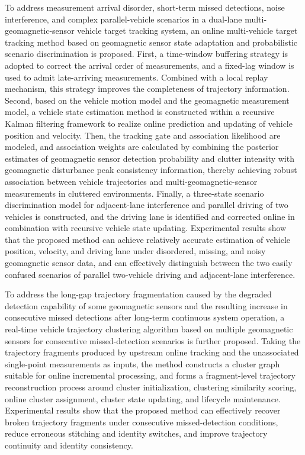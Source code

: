 To address measurement arrival disorder, short-term missed detections, noise interference, and complex parallel-vehicle scenarios in a dual-lane multi-geomagnetic-sensor vehicle target tracking system, an online multi-vehicle target tracking method based on geomagnetic sensor state adaptation and probabilistic scenario discrimination is proposed. First, a time-window buffering strategy is adopted to correct the arrival order of measurements, and a fixed-lag window is used to admit late-arriving measurements. Combined with a local replay mechanism, this strategy improves the completeness of trajectory information. Second, based on the vehicle motion model and the geomagnetic measurement model, a vehicle state estimation method is constructed within a recursive Kalman filtering framework to realize online prediction and updating of vehicle position and velocity. Then, the tracking gate and association likelihood are modeled, and association weights are calculated by combining the posterior estimates of geomagnetic sensor detection probability and clutter intensity with geomagnetic disturbance peak consistency information, thereby achieving robust association between vehicle trajectories and multi-geomagnetic-sensor measurements in cluttered environments. Finally, a three-state scenario discrimination model for adjacent-lane interference and parallel driving of two vehicles is constructed, and the driving lane is identified and corrected online in combination with recursive vehicle state updating. Experimental results show that the proposed method can achieve relatively accurate estimation of vehicle position, velocity, and driving lane under disordered, missing, and noisy geomagnetic sensor data, and can effectively distinguish between the two easily confused scenarios of parallel two-vehicle driving and adjacent-lane interference.

To address the long-gap trajectory fragmentation caused by the degraded detection capability of some geomagnetic sensors and the resulting increase in consecutive missed detections after long-term continuous system operation, a real-time vehicle trajectory clustering algorithm based on multiple geomagnetic sensors for consecutive missed-detection scenarios is further proposed. Taking the trajectory fragments produced by upstream online tracking and the unassociated single-point measurements as inputs, the method constructs a cluster graph suitable for online incremental processing, and forms a fragment-level trajectory reconstruction process around cluster initialization, clustering similarity scoring, online cluster assignment, cluster state updating, and lifecycle maintenance. Experimental results show that the proposed method can effectively recover broken trajectory fragments under consecutive missed-detection conditions, reduce erroneous stitching and identity switches, and improve trajectory continuity and identity consistency.